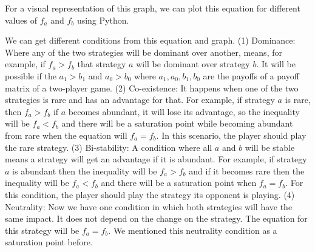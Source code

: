 \documentclass{article}
\begin{document}
For a visual representation of this graph, we can plot this equation for different values of $f_a$ and $f_b$ using Python.
\begin{figure}[h]
        \centering
        \label{fig:Visualization of $x_a(1-x_a)(f_a-f_b)=0$}
    \end{figure}
We can get different conditions from this equation and graph. 
(1) Dominance: Where any of the two strategies will be dominant over another, means, for example, if $f_a>f_b$ that strategy $a$ will be dominant over strategy $b$. It will be possible if the $a_1>b_1$ and $a_0>b_0$ where $a_1,a_0,b_1,b_0$ are the payoffs of a payoff matrix of a two-player game.
(2) Co-existence: It happens when one of the two strategies is rare and has an advantage for that. For example, if strategy $a$ is rare, then $f_a>f_b$ if $a$ becomes abundant, it will lose its advantage, so the inequality will be  $f_a<f_b$ and there will be a saturation point while becoming abundant from rare when the equation will $f_a=f_b$. In this scenario, the player should play the rare strategy.
(3) Bi-stability: A condition where all $a$ and $b$ will be stable means a strategy will get an advantage if it is abundant. For example, if strategy $a$ is abundant then the inequality will be $f_a>f_b$ and if it becomes rare then the inequality will be $f_a<f_b$ and there will be a saturation point when $f_a=f_b$. For this condition, the player should play the strategy its opponent is playing.
(4) Neutrality: Now we have one condition in which both strategies will have the same impact. It does not depend on the change on the strategy. The equation for this strategy will be $f_a=f_b$. We mentioned this neutrality condition as a saturation point before\cite{Gokhale2011}.
\end{document}
